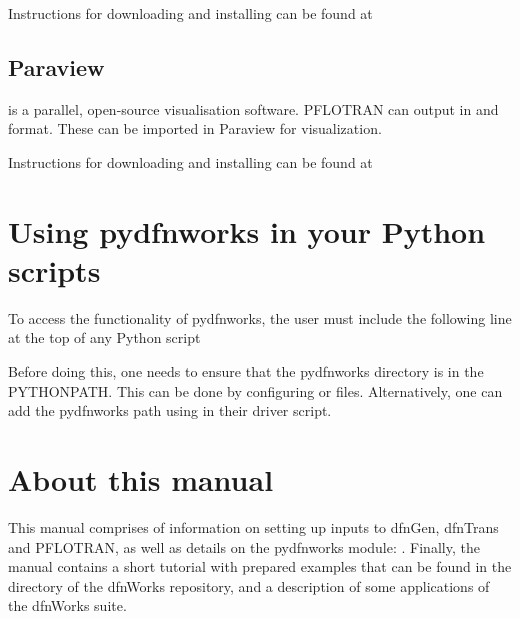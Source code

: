 \documentclass[letterpaper,10pt,english]{sphinxmanual}
\begin{document}
Instructions for downloading and installing  can be found at


\subsection{Paraview}
\label{\detokenize{intro:id5}}\label{\detokenize{intro:paraview}}
 is a parallel, open-source visualisation software. PFLOTRAN can
output in  and  format. These can be imported in Paraview
for visualization.

Instructions for downloading and installing  can be found at


\section{Using pydfnworks in your Python scripts}
\label{\detokenize{intro:id6}}\label{\detokenize{intro:using-pydfnworks-in-your-python-scripts}}
To access the functionality of pydfnworks, the user must include the
following line at the
top of any Python script

\begin{sphinxVerbatim}[commandchars=\\\{\}]
 
\end{sphinxVerbatim}

Before doing this, one needs to ensure that the pydfnworks directory is in the
PYTHONPATH. This can be done by configuring  or  files.
Alternatively, one can add the pydfnworks path using 
in their driver script.


\section{About this  manual}
\label{\detokenize{intro:about-this-manual}}
This manual comprises of information on setting up inputs to dfnGen, dfnTrans
and PFLOTRAN, as well as details on the pydfnworks module: {\hyperref[\detokenize{pydfnworks:dfnworks-python-chapter}]{}}. Finally, the manual contains a short tutorial
with prepared examples that  can be found in the  directory of the
dfnWorks repository, and a description of some applications of the dfnWorks
suite.
\end{document}
